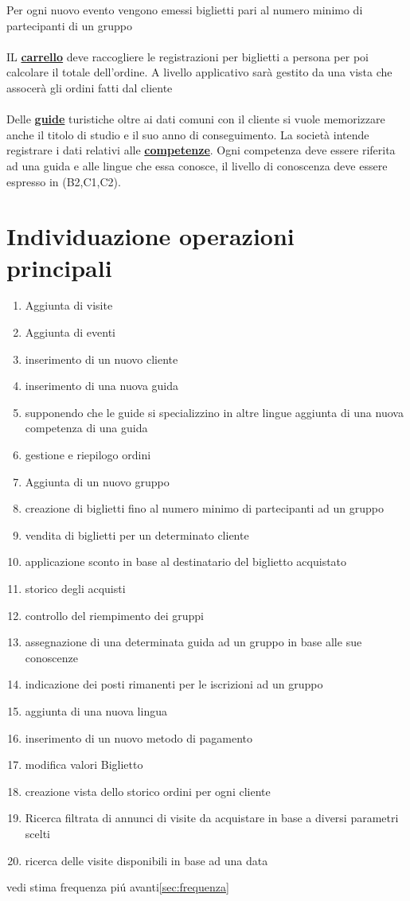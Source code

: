 \documentclass[a4paper,12pt]{report}
\begin{document}
Per ogni nuovo evento vengono emessi biglietti pari al numero minimo di partecipanti di un gruppo\\\\
IL \textbf{\underline{carrello}} deve raccogliere le registrazioni per biglietti a persona per poi calcolare
il totale dell'ordine. A livello applicativo sarà gestito da una vista che assocerà gli ordini fatti dal cliente \\\\
Delle \textbf{\underline{guide}} turistiche oltre ai dati comuni con il cliente si vuole memorizzare
anche il titolo di studio e il suo anno di conseguimento. La società intende registrare i dati relativi
alle \textbf{\underline{competenze}}. Ogni competenza deve essere riferita ad una guida e alle lingue che essa conosce,
il livello di conoscenza deve essere espresso in (B2,C1,C2).

\section*{Individuazione operazioni principali}\label{sec:operazioni}
\begin{enumerate}
    \item Aggiunta di visite
    \item Aggiunta di eventi
    \item inserimento di un nuovo cliente
    \item inserimento di una nuova guida
    \item supponendo che le guide si specializzino in altre lingue aggiunta di una nuova competenza di una guida
    \item gestione e riepilogo ordini
    \item Aggiunta di un nuovo gruppo
    \item creazione di biglietti fino al numero minimo di partecipanti ad un gruppo
    \item vendita di biglietti per un determinato cliente
    \item applicazione sconto in base al destinatario del biglietto acquistato
    \item storico degli acquisti
    \item controllo del riempimento dei gruppi
    \item assegnazione di una determinata guida ad un gruppo in base alle sue conoscenze
    \item indicazione dei posti rimanenti per le iscrizioni ad un gruppo
    \item aggiunta di una nuova lingua
    \item inserimento di un nuovo metodo di pagamento
    \item modifica valori Biglietto
    \item creazione vista dello storico ordini per ogni cliente
    \item Ricerca filtrata di annunci di visite da
          acquistare in base a diversi parametri scelti
    \item ricerca delle visite disponibili in base ad una data
\end{enumerate}
vedi stima frequenza piú avanti\ref{sec:frequenza}
\newpage
\end{document}

